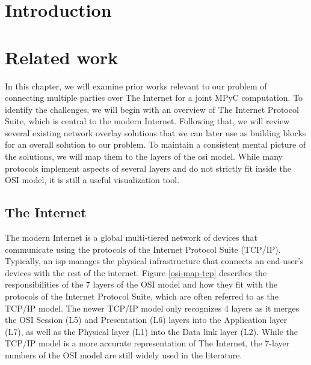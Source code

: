 \hypertarget{thesis__001-preamble.md}{}
\tableofcontents

\printnoidxglossary[type=\acronymtype,title=List of Abbreviations]
\listoffigures

\mainmatter

\hypertarget{thesis__010-intro.md}{}
\hypertarget{thesis__010-intro.md__introduction}{%
\chapter{Introduction}\label{thesis__010-intro.md__introduction}}

\hypertarget{thesis__020-related-work.md}{}
\hypertarget{thesis__020-related-work.md__related-work}{%
\chapter{Related work}\label{thesis__020-related-work.md__related-work}}

In this chapter, we will examine prior works relevant to our problem of
connecting multiple parties over The Internet for a joint MPyC
computation. To identify the challenges, we will begin with an overview
of The Internet Protocol Suite, which is central to the modern Internet.
Following that, we will review several existing network overlay
solutions that we can later use as building blocks for an overall
solution to our problem. To maintain a consistent mental picture of the
solutions, we will map them to the layers of the \gls{osi} model. While
many protocols implement aspects of several layers and do not strictly
fit inside the OSI model, it is still a useful visualization tool.

\hypertarget{thesis__020-related-work.md__the-internet}{%
\section{The Internet}\label{thesis__020-related-work.md__the-internet}}

The modern Internet is a global multi-tiered network of devices that
communicate using the protocols of the Internet Protocol Suite (TCP/IP).
Typically, an \gls{isp} manages the physical infrastructure that
connects an end-user's devices with the rest of the internet. Figure
\ref{osi-map-tcp} describes the responsibilities of the 7 layers of the
OSI model and how they fit with the protocols of the Internet Protocol
Suite, which are often referred to as the TCP/IP model. The newer TCP/IP
model only recognizes 4 layers as it merges the OSI Session (L5) and
Presentation (L6) layers into the Application layer (L7), as well as the
Physical layer (L1) into the Data link layer (L2). While the TCP/IP
model is a more accurate representation of The Internet, the 7-layer
numbers of the OSI model are still widely used in the literature.

